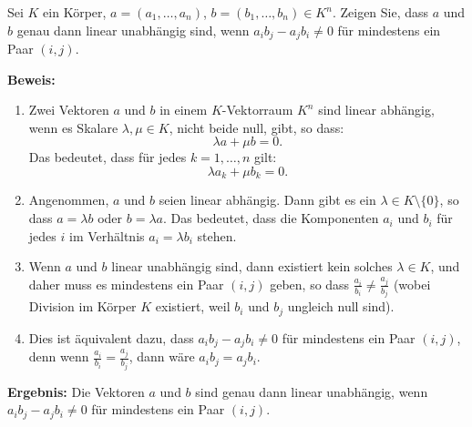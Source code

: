 \documentclass[11pt]{article}
\begin{document}
Sei \( K \) ein Körper, \( a = (a_1, \dots, a_n) \), \( b = (b_1, \dots, b_n) \in K^n \). Zeigen Sie, dass \( a \) und \( b \) genau dann linear unabhängig sind, wenn \( a_i b_j - a_j b_i \neq 0 \) für mindestens ein Paar \( (i, j) \).

\textbf{Beweis:}

\begin{enumerate}
    \item Zwei Vektoren \( a \) und \( b \) in einem \( K \)-Vektorraum \( K^n \) sind linear abhängig, wenn es Skalare \( \lambda, \mu \in K \), nicht beide null, gibt, so dass:
    \[
    \lambda a + \mu b = 0.
    \]
    Das bedeutet, dass für jedes \( k = 1, \dots, n \) gilt:
    \[
    \lambda a_k + \mu b_k = 0.
    \]

    \item Angenommen, \( a \) und \( b \) seien linear abhängig. Dann gibt es ein \( \lambda \in K \setminus \{0\} \), so dass \( a = \lambda b \) oder \( b = \lambda a \). Das bedeutet, dass die Komponenten \( a_i \) und \( b_i \) für jedes \( i \) im Verhältnis \( a_i = \lambda b_i \) stehen.

    \item Wenn \( a \) und \( b \) linear unabhängig sind, dann existiert kein solches \( \lambda \in K \), und daher muss es mindestens ein Paar \( (i, j) \) geben, so dass \( \frac{a_i}{b_i} \neq \frac{a_j}{b_j} \) (wobei Division im Körper \( K \) existiert, weil \( b_i \) und \( b_j \) ungleich null sind).

    \item Dies ist äquivalent dazu, dass \( a_i b_j - a_j b_i \neq 0 \) für mindestens ein Paar \( (i, j) \), denn wenn \( \frac{a_i}{b_i} = \frac{a_j}{b_j} \), dann wäre \( a_i b_j = a_j b_i \).
\end{enumerate}

\textbf{Ergebnis:} Die Vektoren \( a \) und \( b \) sind genau dann linear unabhängig, wenn \( a_i b_j - a_j b_i \neq 0 \) für mindestens ein Paar \( (i, j) \).



\end{document}
